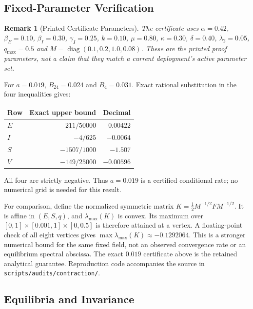 \documentclass[11pt,twocolumn]{article}
\newtheorem{remark}[theorem]{Remark}
\begin{document}
\subsection*{Fixed-Parameter Verification}

\begin{remark}[Printed Certificate Parameters]
\label{rem:production-params}
The certificate uses
$\alpha=0.42$, $\beta_E=0.10$, $\beta_I=0.30$,
$\gamma_I=0.25$, $k=0.10$, $\mu=0.80$, $\kappa=0.30$,
$\delta=0.40$, $\lambda_2=0.05$, $q_{\max}=0.5$ and
$M=\operatorname{diag}(0.1,0.2,1.0,0.08)$.
These are the printed proof parameters, not a claim that they
match a current deployment's active parameter set.
\end{remark}

For $a=0.019$, $B_{24}=0.024$ and $B_4=0.031$. Exact rational
substitution in the four inequalities gives:
\begin{center}
\small
\begin{tabular}{@{}lrr@{}}
\toprule
Row & Exact upper bound & Decimal\\
\midrule
$E$ & $-211/50000$ & $-0.00422$\\
$I$ & $-4/625$ & $-0.0064$\\
$S$ & $-1507/1000$ & $-1.507$\\
$V$ & $-149/25000$ & $-0.00596$\\
\bottomrule
\end{tabular}
\end{center}
All four are strictly negative. Thus $a=0.019$ is a certified
conditional rate; no numerical grid is needed for this result.

For comparison, define the normalized symmetric matrix
$K=\tfrac12 M^{-1/2}FM^{-1/2}$. It is affine in $(E,S,q)$,
and $\lambda_{\max}(K)$ is convex. Its maximum over
$[0,1]\times[0.001,1]\times[0,0.5]$ is therefore attained at a
vertex. A floating-point check of all eight vertices gives
$\max\lambda_{\max}(K)\approx-0.1292064$. This is a stronger
numerical bound for the same fixed field, not an observed
convergence rate or an equilibrium spectral abscissa. The exact
$0.019$ certificate above is the retained analytical guarantee.
Reproduction code accompanies the source in
\texttt{scripts/audits/contraction/}.

\subsection*{Equilibria and Invariance}
\end{document}
